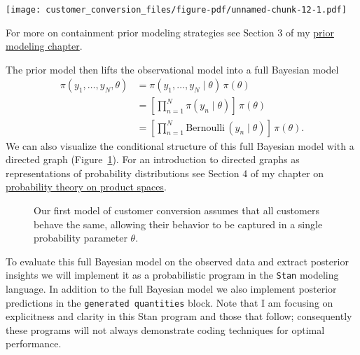 \documentclass[
  letterpaper,
  DIV=11,
  numbers=noendperiod]{scrartcl}
\begin{document}
\texttt{[image: customer\_conversion\_files/figure-pdf/unnamed-chunk-12-1.pdf]}

For more on containment prior modeling strategies see Section 3 of my
\href{https://betanalpha.github.io/assets/case_studies/prior_modeling.html}{prior
modeling chapter}.

The prior model then lifts the observational model into a full Bayesian
model \begin{align*}
\pi(y_{1}, \ldots, y_{N}, \theta)
&=
\pi(y_{1}, \ldots, y_{N} \mid \theta) \, \pi(\theta)
\\
&=
\left[ \prod_{n = 1}^{N} \pi(y_{n} \mid \theta) \right] \,
\pi(\theta)
\\
&=
\left[ \prod_{n = 1}^{N} \text{Bernoulli} \,(y_{n} \mid \theta) \right] \,
\pi(\theta).
\end{align*} We can also visualize the conditional structure of this
full Bayesian model with a directed graph (Figure~\ref{fig-model1}). For
an introduction to directed graphs as representations of probability
distributions see Section 4 of my chapter on
\href{https://betanalpha.github.io/assets/case_studies/probability_on_product_spaces.html\#4_Directed_Graphical_Models}{probability
theory on product spaces}.

\begin{figure}


\caption{\label{fig-model1}Our first model of customer conversion
assumes that all customers behave the same, allowing their behavior to
be captured in a single probability parameter \(\theta\).}

\end{figure}%

To evaluate this full Bayesian model on the observed data and extract
posterior insights we will implement it as a probabilistic program in
the \texttt{Stan} modeling language. In addition to the full Bayesian
model we also implement posterior predictions in the
\texttt{generated\ quantities} block. Note that I am focusing on
explicitness and clarity in this Stan program and those that follow;
consequently these programs will not always demonstrate coding
techniques for optimal performance.
\end{document}
